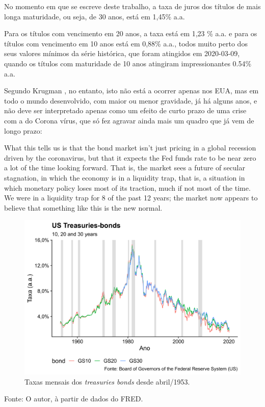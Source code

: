 \documentclass[
	12pt,				%
	oneside,			%
	a4paper,			%
	chapter=TITLE,		%
	section=TITLE,		%
	english,			%
	brazil				%
	]{abntex2}
\newcommand{\bcenter}{\begin{center}}
\newcommand{\ecenter}{\end{center}}
\begin{document}
No momento em que se escreve deste trabalho, a taxa de juros dos títulos
de mais longa maturidade, ou seja, de 30 anos, está em 1,45\% a.a.

Para os títulos com vencimento em 20 anos, a taxa está em 1,23 \% a.a. e
para os títulos com vencimento em 10 anos está em 0,88\% a.a., todos
muito perto dos seus valores mínimos da série histórica, que foram
atingidos em 2020-03-09, quando os títulos com maturidade de 10 anos
atingiram impressionantes 0.54\% a.a.

Segundo Krugman \autocite*{krugman2020}, no entanto, isto não está a
ocorrer apenas nos EUA, mas em todo o mundo desenvolvido, com maior ou
menor gravidade, já há alguns anos, e não deve ser interpretado apenas
como um efeito de curto prazo de uma crise com a do Corona vírus, que só
fez agravar ainda mais um quadro que já vem de longo prazo:
\begin{citacao}
What this tells us is that the bond market isn’t just pricing in a global
recession driven by the coronavirus, but that it expects the Fed funds rate to
be near zero a lot of the time looking forward. That is, the market sees a
future of secular stagnation, in which the economy is in a liquidity trap, that
is, a situation in which monetary policy loses most of its traction, much if not
most of the time. We were in a liquidity trap for 8 of the past 12 years; the
market now appears to believe that something like this is the new normal.
\end{citacao}
\begin{figure}[H]

{\centering \includegraphics[width=\textwidth]{images/fred-1} 

}

\caption{Taxas mensais dos \emph{treasuries bonds} desde abril/1953.}\label{fig:fred}
\end{figure}
\bcenter
Fonte: O autor, à partir de dados do \gls{FRED}. \ecenter
\end{document}
